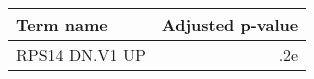 \begin{tabular}{lr}
\toprule
     Term name &  Adjusted p-value \\
\midrule
RPS14 DN.V1 UP &               .2e \\
\bottomrule
\end{tabular}
